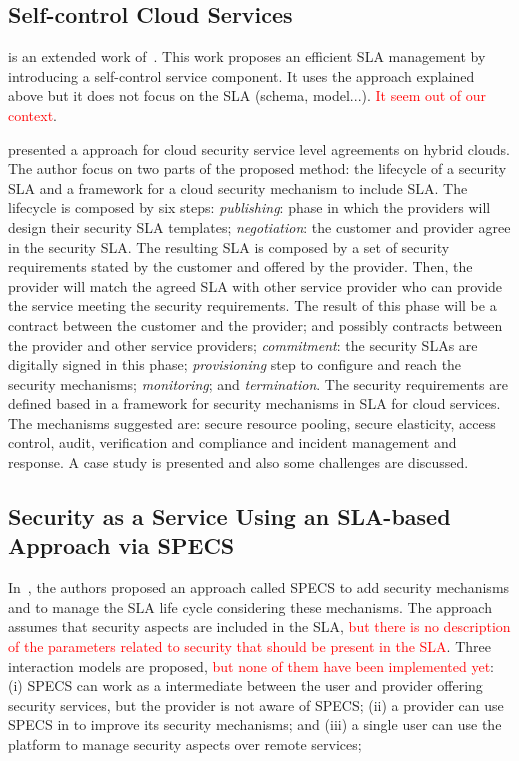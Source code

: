 \documentclass[12pt,a4paper,oneside]{article}
\begin{document}
\subsection{Self-control Cloud Services}

\cite{008} is an extended work of~\cite{009}. This work proposes an efficient SLA management by introducing a self-control service component. It uses the approach explained above but it does not focus on the SLA (schema, model...). \textcolor{red}{It seem out of our context}.

\bigskip
\cite{011} presented a approach for cloud security service level agreements on hybrid clouds. The author focus on two parts of the proposed method: the lifecycle of a security SLA and a framework for a cloud security mechanism to include SLA. The lifecycle is composed by six steps: \textit{publishing}: phase in which the providers will design their security SLA templates; \textit{negotiation}: the customer and provider agree in the security SLA. The resulting SLA is composed by a set of security requirements stated by the customer and offered by the provider. Then, the provider will match the agreed SLA with other service provider who can provide the service meeting the security requirements. The result of this phase will be a contract between the customer and the provider; and possibly contracts between the provider and other service providers; \textit{commitment}: the security SLAs are digitally signed in this phase; \textit{provisioning} step to configure and reach the security mechanisms; \textit{monitoring}; and \textit{termination}. The security requirements are defined based in a framework for security mechanisms in SLA for cloud services. The mechanisms suggested are: secure resource pooling, secure elasticity, access control, audit, verification and compliance and incident management and response. A case study is presented and also some challenges are discussed.

\subsection{Security as a Service Using an SLA-based Approach via SPECS}

In~\cite{050}, the authors proposed an approach called SPECS to add security mechanisms and to manage the SLA life cycle considering these mechanisms. The approach assumes that  security aspects are included in the SLA, \textcolor{red}{but there is no description of the parameters related to security that should be present in the SLA}. Three interaction models are proposed, \textcolor{red}{but none of them have been implemented yet}: (i) SPECS can work as a intermediate between the user and provider offering security services, but the provider is not aware of SPECS; (ii) a provider can use SPECS in to improve its security mechanisms; and (iii) a single user can use the platform to manage security aspects over remote services; 
\end{document}
